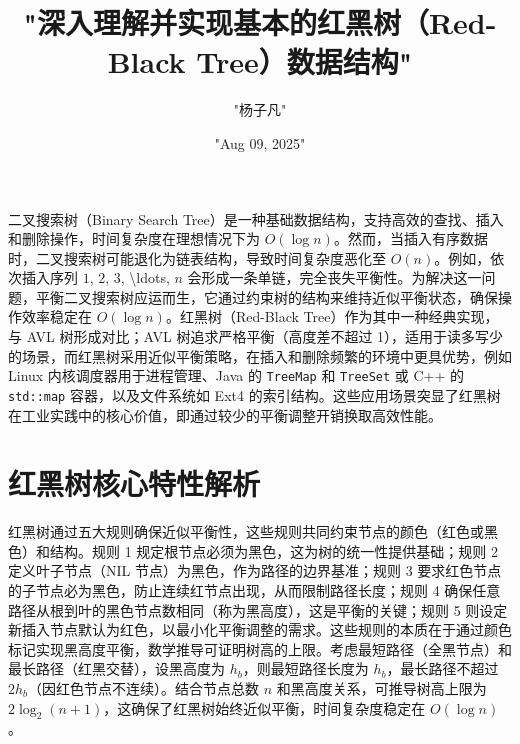 \title{"深入理解并实现基本的红黑树（Red-Black Tree）数据结构"}
\author{"杨子凡"}
\date{"Aug 09, 2025"}
\maketitle
二叉搜索树（Binary Search Tree）是一种基础数据结构，支持高效的查找、插入和删除操作，时间复杂度在理想情况下为 $O(\log{n})$。然而，当插入有序数据时，二叉搜索树可能退化为链表结构，导致时间复杂度恶化至 $O(n)$。例如，依次插入序列 $1$, $2$, $3$, \textbackslash{}ldots, $n$ 会形成一条单链，完全丧失平衡性。为解决这一问题，平衡二叉搜索树应运而生，它通过约束树的结构来维持近似平衡状态，确保操作效率稳定在 $O(\log{n})$。红黑树（Red-Black Tree）作为其中一种经典实现，与 AVL 树形成对比；AVL 树追求严格平衡（高度差不超过 1），适用于读多写少的场景，而红黑树采用近似平衡策略，在插入和删除频繁的环境中更具优势，例如 Linux 内核调度器用于进程管理、Java 的 \texttt{TreeMap} 和 \texttt{TreeSet} 或 C++ 的 \texttt{std::map} 容器，以及文件系统如 Ext4 的索引结构。这些应用场景突显了红黑树在工业实践中的核心价值，即通过较少的平衡调整开销换取高效性能。\par
\chapter{红黑树核心特性解析}
红黑树通过五大规则确保近似平衡性，这些规则共同约束节点的颜色（红色或黑色）和结构。规则 1 规定根节点必须为黑色，这为树的统一性提供基础；规则 2 定义叶子节点（NIL 节点）为黑色，作为路径的边界基准；规则 3 要求红色节点的子节点必为黑色，防止连续红节点出现，从而限制路径长度；规则 4 确保任意路径从根到叶的黑色节点数相同（称为黑高度），这是平衡的关键；规则 5 则设定新插入节点默认为红色，以最小化平衡调整的需求。这些规则的本质在于通过颜色标记实现黑高度平衡，数学推导可证明树高的上限。考虑最短路径（全黑节点）和最长路径（红黑交替），设黑高度为 $h_b$，则最短路径长度为 $h_b$，最长路径不超过 $2h_b$（因红色节点不连续）。结合节点总数 $n$ 和黑高度关系，可推导树高上限为 $2 \log_2(n + 1)$，这确保了红黑树始终近似平衡，时间复杂度稳定在 $O(\log{n})$。\par
